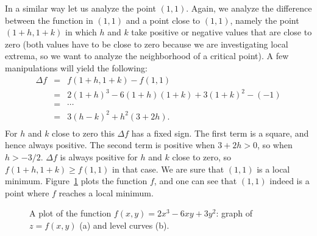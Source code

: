 \begin{example}
In a similar way let us analyze the point $(1,1)$. Again, we analyze the difference between the function in $(1,1)$ and a point close to $(1,1)$, namely the point $(1+h,1+k)$ in which $h$ and $k$ take positive or negative values that are close to zero (both values have to be close to zero because we are investigating local extrema, so we want to analyze the neighborhood of a critical point). A few manipulations will yield the following:  
\begin{eqnarray*}
 \Delta f &=& f(1+h,1+k) - f(1,1) \\ 
&=& 2 (1+h)^3 - 6 (1+h)(1+k) + 3 (1+k)^2 - (-1) \\
&=& \cdots \\
&=& 3 (h-k)^2 + h^2 (3+2h). \\ 
\end{eqnarray*}
For $h$ and $k$ close to zero this $\Delta f$ has a fixed sign. The first term is a square, and hence always positive. The second term is positive when $3+2h > 0$, so when $h > -3/2$. $\Delta f$ is always positive for $h$ and $k$ close to zero, so $f(1+h,1+k) \geq f(1,1)$ in that case.  We are sure that $(1,1)$ is a local minimum. Figure~\ref{fig_multi_var_26} plots the function $f$, and one can see that $(1,1)$ indeed is a point where $f$ reaches a local minimum. 

\begin{figure}[H]
\centering
\qquad
{}
\caption{A plot of the function $f(x,y) = 2 x^3 - 6 x y + 3 y^2$:  graph of $z=f(x,y)$ (a) and  level curves (b).  \label{fig_multi_var_26}}
\end{figure}
\end{example} 


